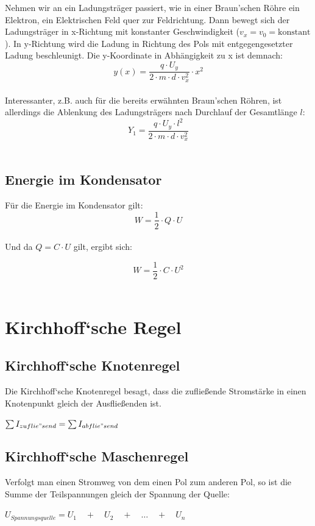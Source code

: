 \documentclass[a4paper]{article}
\begin{document}
Nehmen wir an ein Ladungsträger passiert, wie in einer Braun'schen Röhre ein Elektron, ein Elektrischen Feld
quer zur Feldrichtung. Dann bewegt sich der Ladungsträger in x-Richtung mit konstanter Geschwindigkeit
($v_x = v_0 = \text{konstant}$). In y-Richtung wird die Ladung in Richtung des Pols mit entgegengesetzter Ladung
beschleunigt. Die y-Koordinate in Abhängigkeit zu x ist demnach:\\ $$y(x) = \dfrac{q \cdot U_y}{2 \cdot m \cdot d \cdot v_x ^2} \cdot x^2$$\\

Interessanter, z.B. auch für die bereits erwähnten Braun'schen Röhren, ist allerdings die Ablenkung des Ladungsträgers
nach Durchlauf der Gesamtlänge $l$:\\

\Large$$Y_1 = \dfrac{q \cdot U_y \cdot l^2}{2 \cdot m \cdot d \cdot v_x ^2}$$\\ \normalsize



\newpage
\subsection{Energie im Kondensator}

Für die Energie im Kondensator gilt:\\

$$W = \frac{1}{2} \cdot Q \cdot U$$\\

Und da $Q = C \cdot U$ gilt, ergibt sich:

\Large$$W = \frac{1}{2} \cdot C \cdot U^2$$\\ \normalsize





\section{Kirchhoff‘sche Regel}
\subsection{Kirchhoff‘sche Knotenregel}
Die Kirchhoff‘sche Knotenregel besagt, dass die zufließende Stromstärke in einen Knotenpunkt gleich der
Ausfließenden ist.

\begin{center}
    \Large 
        $\sum{I_{zuflie"send}} = \sum{I_{abflie"send}}$\\[1cm]
    \normalsize
\end{center}


\subsection{Kirchhoff‘sche Maschenregel}
Verfolgt man einen Stromweg von dem einen Pol zum anderen Pol, so ist die Summe der
Teilspannungen gleich der Spannung der Quelle:


\begin{center}
    \Large 
        $U_{Spannungsquelle} = U_1 \quad + \quad U_2 \quad + \quad \dots \quad + \quad U_n$\\[1cm]
    \normalsize
\end{center}
\end{document}
